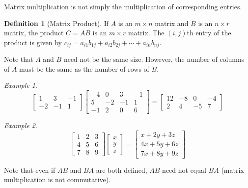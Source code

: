 \documentclass[10pt, a4paper]{amsart}
\theoremstyle{definition}
\newtheorem{defn}{Definition}
\theoremstyle{remark}
\newtheorem{ex}{Example}
\begin{document}
Matrix multiplication is not simply the multiplication of corresponding entries.

\begin{defn}[Matrix Product]
  If $ A $ is an $ m \times n $ matrix and $ B $ is an $ n \times r $ matrix, the product
  $ C = AB $ is an $ m \times r $ matrix. The $ (i,j)$th entry of the product is given by
  $ c_{ij} = a_{i1}b_{1j} + a_{i2}b_{2j} + \cdots + a_{in}b_{nj} $.
\end{defn}

Note that $ A $ and $ B $ need not be the same size. However, the number of columns of $ A $ must
be the same as the number of rows of $ B $.

\begin{ex}
  \begin{displaymath}
    \begin{bmatrix} 1 & 3 & -1 \\ -2 & -1 & 1 \end{bmatrix}
    \begin{bmatrix} -4 & 0 & 3 & -1 \\ 5 & -2 & -1 & 1 \\ -1 & 2 & 0 & 6 \end{bmatrix} =
    \begin{bmatrix} 12 & -8 & 0 & -4 \\ 2 & 4 & -5 & 7 \end{bmatrix}
  \end{displaymath}
\end{ex}

\begin{ex}
  \begin{displaymath}
    \begin{bmatrix} 1 & 2 & 3 \\ 4 & 5 & 6 \\ 7 & 8 & 9 \end{bmatrix}
    \begin{bmatrix} x \\ y \\z \end{bmatrix} =
    \begin{bmatrix} x + 2y + 3z \\ 4x + 5y + 6z \\ 7x + 8y + 9z \end{bmatrix}
  \end{displaymath}
  \label{ex:VariableMultiply}
\end{ex}

Note that even if $ AB $ and $ BA $ are both defined, $ AB $ need not equal $ BA $ (matrix
multiplication is not commutative).
\end{document}
